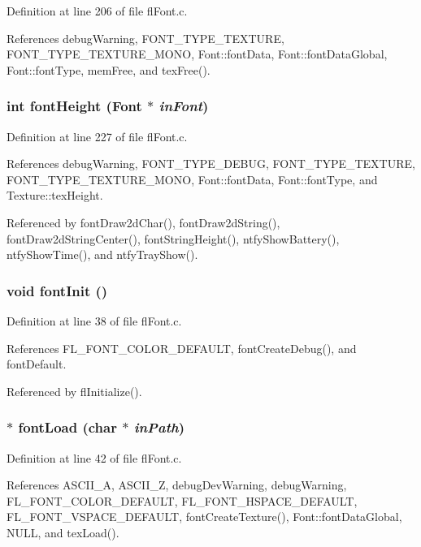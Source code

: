 Definition at line 206 of file fl\-Font.c.

References debug\-Warning, FONT\_\-TYPE\_\-TEXTURE, FONT\_\-TYPE\_\-TEXTURE\_\-MONO, Font::font\-Data, Font::font\-Data\-Global, Font::font\-Type, mem\-Free, and tex\-Free().
\subsubsection{\setlength{\rightskip}{0pt plus 5cm}int font\-Height ({\bf Font} $\ast$ {\em in\-Font})}\label{flFont_8c_52a6b73a87f357f4063ff8ebc8e5f974}




Definition at line 227 of file fl\-Font.c.

References debug\-Warning, FONT\_\-TYPE\_\-DEBUG, FONT\_\-TYPE\_\-TEXTURE, FONT\_\-TYPE\_\-TEXTURE\_\-MONO, Font::font\-Data, Font::font\-Type, and Texture::tex\-Height.

Referenced by font\-Draw2d\-Char(), font\-Draw2d\-String(), font\-Draw2d\-String\-Center(), font\-String\-Height(), ntfy\-Show\-Battery(), ntfy\-Show\-Time(), and ntfy\-Tray\-Show().
\subsubsection{\setlength{\rightskip}{0pt plus 5cm}void font\-Init ()}\label{flFont_8c_0416d15ad6ddec5fe49d09760dceee01}




Definition at line 38 of file fl\-Font.c.

References FL\_\-FONT\_\-COLOR\_\-DEFAULT, font\-Create\-Debug(), and font\-Default.

Referenced by fl\-Initialize().
\subsubsection{$\ast$ font\-Load (char $\ast$ {\em in\-Path})}\label{flFont_8c_21e0e8e442c8946619ed709ab8758dd5}




Definition at line 42 of file fl\-Font.c.

References ASCII\_\-A, ASCII\_\-Z, debug\-Dev\-Warning, debug\-Warning, FL\_\-FONT\_\-COLOR\_\-DEFAULT, FL\_\-FONT\_\-HSPACE\_\-DEFAULT, FL\_\-FONT\_\-VSPACE\_\-DEFAULT, font\-Create\-Texture(), Font::font\-Data\-Global, NULL, and tex\-Load().
